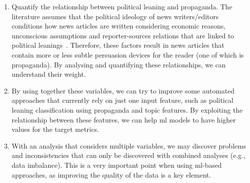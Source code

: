     \begin{enumerate}
        \item Quantify the relationship between political leaning and propaganda. The literature assumes %
        that the political ideology of news writers/editors conditions how news articles are written considering economic reasons, unconscious assumptions and reporter-sources relations that are linked to political leanings~\citep{schudson2002news}. Therefore, these factors result in news articles that contain more or less subtle persuasion devices for the reader (one of which is propaganda). By analysing and quantifying these relationships, we can understand their weight. %
        \item By using together these variables, we can try to improve some automated approaches that currently rely on just one input feature, such as political leaning classification using propaganda and topic features. By exploiting the relationship between these features, we can help \acrfull{ml} models to have higher values for the target metrics. %
        \item With an analysis that considers multiple variables, we may discover problems and inconsistencies that can only be discovered with combined analyses (e.g., data imbalance). This is a very important point when using \acrshort{ml}-based approaches, as improving the quality of the data is a key element. %
    \end{enumerate}


